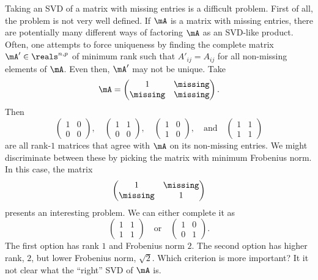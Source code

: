 Taking an SVD of a matrix with missing entries is a difficult problem.  First of all, the problem is not very well defined.  If $\mA$ is a matrix with missing entries, there are potentially many different ways of factoring $\mA$ as an SVD-like product.  Often, one attempts to force uniqueness by finding the complete matrix $\mA' \in \reals^{n,p}$ of minimum rank such that $A'_{ij} = A_{ij}$ for all non-missing elements of $\mA$.  Even then, $\mA'$ may not be unique.  Take
\[
    \mA
    =
    \left(
    \begin{matrix}
        1        & \missing \\
        \missing & \missing
    \end{matrix}
    \right).
\]
Then
\[
    \left(
    \begin{matrix}
        1 & 0 \\
        0 & 0
    \end{matrix}
    \right),
    \quad
    \left(
    \begin{matrix}
        1 & 1 \\
        0 & 0
    \end{matrix}
    \right),
    \quad
    \left(
    \begin{matrix}
        1 & 0 \\
        1 & 0
    \end{matrix}
    \right),
    \quad
    \text{and}
    \quad
    \left(
    \begin{matrix}
        1 & 1 \\
        1 & 1
    \end{matrix}
    \right)
\]
are all rank-$1$ matrices that agree with $\mA$ on its non-missing entries.  We might discriminate between these by picking the matrix with minimum Frobenius norm.  In this case, the matrix
\[
    \left(
    \begin{matrix}
        1 & \missing \\
        \missing & 1
    \end{matrix}
    \right)
\]
presents an interesting problem.  We can either complete it as
\[
    \left(
    \begin{matrix}
        1 & 1 \\
        1 & 1
    \end{matrix}
    \right)
    \quad
    \text{or}
    \quad
    \left(
    \begin{matrix}
        1 & 0 \\
        0 & 1
    \end{matrix}
    \right).
\]
The first option has rank $1$ and Frobenius norm $2$.  The second option
has higher rank, $2$, but lower Frobenius norm, $\sqrt{2}$.  Which criterion 
is more important?  It it not clear what the ``right'' SVD of $\mA$ is.

